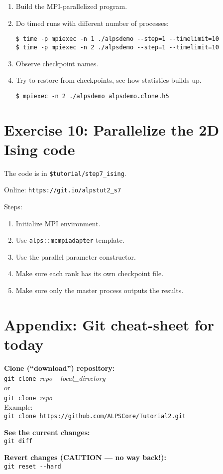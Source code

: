 \documentclass[12pt]{article}
\newcommand{\code}[1]{\texttt{#1}}
\begin{document}
\begin{enumerate}
\item Build the MPI-parallelized program.
\item Do timed runs with different number of processes:
  \begin{lstlisting}[emph={mpiexec}]
$ time -p mpiexec -n 1 ./alpsdemo --step=1 --timelimit=10
$ time -p mpiexec -n 2 ./alpsdemo --step=1 --timelimit=10
  \end{lstlisting} %
\item Observe checkpoint names.
\item Try to restore from checkpoints, see how statistics builds up.
  \begin{lstlisting}[emph={mpiexec}]
$ mpiexec -n 2 ./alpsdemo alpsdemo.clone.h5
\end{lstlisting} %
\end{enumerate}

\pagebreak
\section{Exercise 10: Parallelize the 2D Ising code}

The code is in \texttt{\color{ballblue}\$tutorial/step7\_ising}.

Online: \nolinkurl{https://git.io/alpstut2_s7}

Steps: 
\begin{enumerate}
\item Initialize MPI environment.
\item Use \code{alps::mcmpiadapter} template.
\item Use the parallel parameter constructor.
\item Make sure each rank has its own checkpoint file.
\item Make sure only the master process outputs the results.
\end{enumerate}


\pagebreak
\section{Appendix: Git cheat-sheet for today}
\begin{flushleft}
\textbf{Clone (``download'') repository:}\\
\lstinline[style=showspaces]|git clone |\emph{repo}%
\lstinline[style=showspaces]| |%
\emph{local\_directory}\\
or \\
\lstinline[style=showspaces]|git clone |\emph{repo}\\
Example: \\
\lstinline[style=showspaces]|git clone https://github.com/ALPSCore/Tutorial2.git|

\textbf{See the current changes:}\\
\lstinline[style=showspaces]{git diff}

\textbf{Revert changes (CAUTION --- no way back!):}\\
\lstinline[style=showspaces]|git reset --hard|
\end{flushleft}
\end{document}
